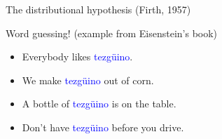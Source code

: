 \documentclass[usenames,dvipsnames,notes,11pt,aspectratio=169]{beamer}
\begin{document}
\begin{frame}
    {The distributional hypothesis}
     (Firth, 1957)
    \pause

    Word guessing! (example from Eisenstein's book)\\
    \begin{itemize}[<+->]
        \item[] Everybody likes \textcolor{blue}{tezg\"uino}.
        \item[] We make \textcolor{blue}{tezg\"uino} out of corn.
        \item[] A bottle of \textcolor{blue}{tezg\"uino} is on the table.
        \item[] Don't have \textcolor{blue}{tezg\"uino} before you drive.
    \end{itemize}

\end{frame}
\end{document}
